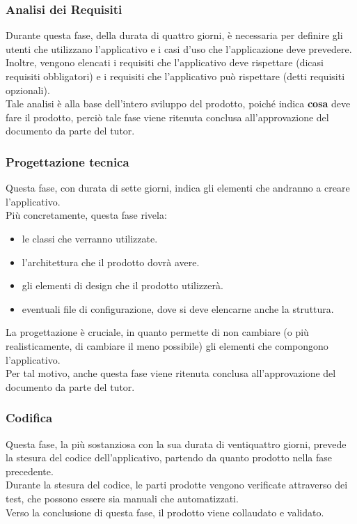 \subsubsection{Analisi dei Requisiti}
Durante questa fase, della durata di quattro giorni, è necessaria per definire gli utenti che utilizzano l'applicativo e i casi d'uso che l'applicazione deve prevedere.\\
Inoltre, vengono elencati i requisiti che l'applicativo deve rispettare (dicasi requisiti obbligatori) e i requisiti che l'applicativo può rispettare (detti requisiti opzionali).\\
Tale analisi è alla base dell'intero sviluppo del prodotto, poiché indica \textbf{cosa} deve fare il prodotto, perciò tale fase viene ritenuta conclusa all'approvazione del documento da parte del tutor.
\subsubsection{Progettazione tecnica}
Questa fase, con durata di sette giorni, indica gli elementi che andranno a creare l'applicativo.\\
Più concretamente, questa fase rivela:
\begin{itemize}
    \item le classi che verranno utilizzate.
    \item l'architettura che il prodotto dovrà avere.
    \item gli elementi di design che il prodotto utilizzerà.
    \item eventuali file di configurazione, dove si deve elencarne anche la struttura.
\end{itemize}
La progettazione è cruciale, in quanto permette di non cambiare (o più realisticamente, di cambiare il meno possibile) gli elementi che compongono l'applicativo.\\
Per tal motivo, anche questa fase viene ritenuta conclusa all'approvazione del documento da parte del tutor.
\subsubsection{Codifica}
Questa fase, la più sostanziosa con la sua durata di ventiquattro giorni, prevede la stesura del codice dell'applicativo, partendo da quanto prodotto nella fase precedente.\\
Durante la stesura del codice, le parti prodotte vengono verificate attraverso dei test, che possono essere sia manuali che automatizzati.\\
Verso la conclusione di questa fase, il prodotto viene collaudato e validato.
